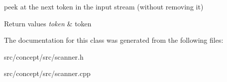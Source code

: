 peek at the next token in the input stream (without removing it) 


\begin{DoxyRetVals}{Return values}
{\em token} & token \\
\hline
\end{DoxyRetVals}


The documentation for this class was generated from the following files\-:\begin{DoxyCompactItemize}
\item 
src/concept/src/scanner.\-h\item 
src/concept/src/scanner.\-cpp\end{DoxyCompactItemize}
